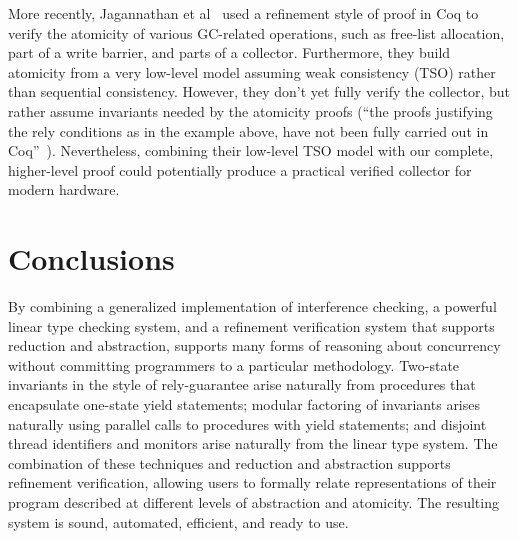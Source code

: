 More recently,
Jagannathan et al~\cite{Jagannathan14} used a refinement style of proof in Coq to verify the atomicity of various GC-related operations,
such as free-list allocation,
part of a write barrier, and parts of a collector.
Furthermore, they build atomicity from a very low-level model assuming weak consistency (TSO) rather than sequential consistency.
However, they don't yet fully verify the collector,
but rather assume invariants needed by the atomicity proofs
(``the proofs justifying the rely conditions as in the example above,
have not been fully carried out in Coq''~\cite{Jagannathan14}).
Nevertheless, combining their low-level TSO model with our complete,
higher-level proof could potentially produce a practical verified collector for modern hardware.

\section{Conclusions}

By combining a generalized implementation of interference checking, a powerful linear type checking system, and a refinement verification system that supports reduction and abstraction, 
\civl supports many forms of reasoning about concurrency without committing programmers to a particular methodology.
Two-state invariants in the style of rely-guarantee arise naturally from procedures that encapsulate one-state yield statements;
modular factoring of invariants arises naturally using parallel calls to procedures with yield statements;
and disjoint thread identifiers and monitors arise naturally from the linear type system. The combination of these techniques and reduction and abstraction supports refinement verification, allowing users to formally relate representations of their program described at different levels of abstraction and atomicity. 
The resulting system is sound, automated, efficient, and ready to use.


